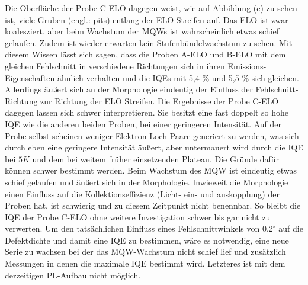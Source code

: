 Die Oberfläche der Probe C-ELO dagegen weist, wie auf Abbildung (c) zu sehen ist, viele Gruben (engl.: pits) entlang der ELO Streifen auf. Das ELO ist zwar koalesziert, aber beim Wachstum der MQWs ist wahrscheinlich etwas schief gelaufen. Zudem ist wieder erwarten kein Stufenbündelwachstum zu sehen. Mit diesem Wissen lässt sich sagen, dass die Proben A-ELO und B-ELO mit dem gleichen Fehlschnitt in verschiedene Richtungen sich in ihren Emissions-Eigenschaften ähnlich verhalten und die IQEs mit 5,4 \% und 5,5 \% sich gleichen. Allerdings äußert sich an der Morphologie eindeutig der Einfluss der Fehlschnitt-Richtung zur Richtung der ELO Streifen.
Die Ergebnisse der Probe C-ELO dagegen lassen sich schwer interpretieren. Sie besitzt eine fast doppelt so hohe IQE wie die anderen beiden Proben, bei einer geringeren Intensität. Auf der Probe selbst scheinen weniger Elektron-Loch-Paare generiert zu werden, was sich durch eben eine geringere Intensität äußert, aber untermauert wird durch die IQE bei $5K$ und dem bei weitem früher einsetzenden Plateau. Die Gründe dafür können schwer bestimmt werden. Beim Wachstum des MQW ist eindeutig etwas schief gelaufen und äußert sich in der Morphologie. Inwieweit die Morphologie einen Einfluss auf die Kollektionseffizienz (Licht- ein- und auskopplung) der 
Proben hat, ist schwierig und zu diesem Zeitpunkt nicht benennbar. So bleibt die IQE der Probe C-ELO ohne weitere Investigation schwer bis gar nicht zu verwerten. Um den tatsächlichen Einfluss eines Fehlschnittwinkels von 0.2$^\circ$ auf die Defektdichte und damit eine IQE zu bestimmen, wäre es notwendig, eine neue Serie zu wachsen bei der das MQW-Wachstum nicht schief lief und zusätzlich Messungen in denen die maximale IQE bestimmt wird. Letzteres ist mit dem derzeitigen PL-Aufbau nicht möglich.


